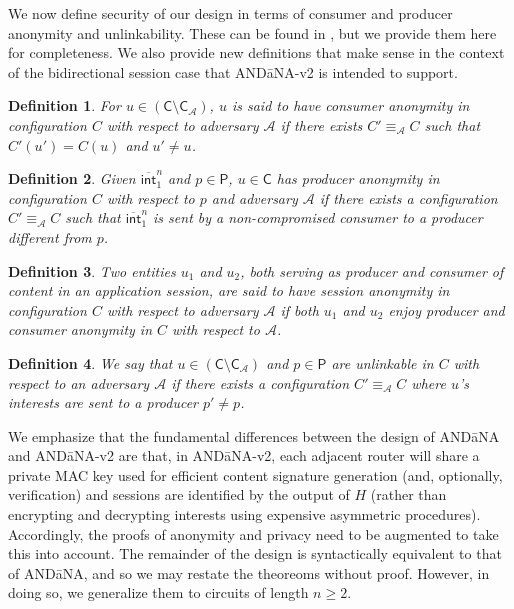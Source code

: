 \documentclass[10pt]{article}
\newtheorem{defn}{\textbf{Definition}}
\begin{document}
We now define security of our design in terms of consumer and producer anonymity and unlinkability. These can be found in \cite{andana}, but we provide them here for completeness. We also provide new definitions that make sense in the context of the bidirectional session case that {\sf AND\=aNA-v2} is intended to support.
\begin{defn}
\cite{andana} For $u \in (\mathsf{C} \setminus \mathsf{C}_{\mathcal{A}})$, $u$ is said to have {\sf consumer anonymity} in configuration $C$ with respect to adversary $\mathcal{A}$ if there exists $C' \equiv_{\mathcal{A}} C$ such that $C'(u') = C(u)$ and $u' \not= u$. 
\end{defn}
\begin{defn}
\cite{andana} Given $\overline{\mathsf{int}}_1^n$ and $p \in \mathsf{P}$, $u \in \mathsf{C}$ has {\sf producer anonymity} in configuration $C$ with respect to $p$ and adversary $\mathcal{A}$ if there exists a configuration $C' \equiv_{\mathcal{A}} C$ such that $\overline{\mathsf{int}}_1^n$ is sent by a non-compromised consumer to a producer different from $p$. 
\end{defn}
\begin{defn}
Two entities $u_1$ and $u_2$, both serving as producer and consumer of content in an application session, are said to have {\sf session anonymity} in configuration $C$ with respect to adversary $\mathcal{A}$ if both $u_1$ and $u_2$ enjoy producer and consumer anonymity in $C$ with respect to $\mathcal{A}$.
\end{defn}
\begin{defn}
\cite{andana} We say that $u \in (\mathsf{C} \setminus \mathsf{C}_{\mathcal{A}})$ and $p \in \mathsf{P}$ are {\sf unlinkable} in $C$ with respect to an adversary $\mathcal{A}$ if there exists a configuration $C' \equiv_{\mathcal{A}} C$ where $u$'s interests are sent to a producer $p' \not= p$.
\end{defn}

We emphasize that the fundamental differences between the design of {\sf AND\=aNA} and {\sf AND\=aNA-v2} are that, in {\sf AND\=aNA-v2}, each adjacent router will share a private MAC key used for efficient content signature generation (and, optionally, verification) and sessions are identified by the output of $H$ (rather than encrypting and decrypting interests using expensive asymmetric procedures). Accordingly, the proofs of anonymity and privacy need to be augmented to take this into account. The remainder of the design is syntactically equivalent to that of {\sf AND\=aNA}, and so we may restate the theoreoms without proof. However, in doing so, we generalize them to circuits of length $n \geq 2$. 
\end{document}
